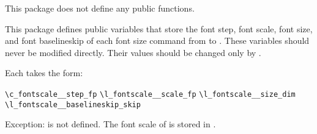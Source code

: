 \documentclass{beery}
\begin{document}
This package does not define any public  functions.

This package defines public  variables that store the font step, font scale, font size, and font baselineskip of each font size command from  to .
These variables should never be modified directly.
Their values should be changed only by .

Each takes the form:

\verb|\c_fontscale_|\verb|_step_fp|
\nopagebreak\newline
\verb|\l_fontscale_|\verb|_scale_fp|
\newline
\verb|\l_fontscale_|\verb|_size_dim|
\nopagebreak\newline
\verb|\l_fontscale_|\verb|_baselineskip_skip|

Exception:
 is not defined.
The font scale of  is stored in .
\end{document}
